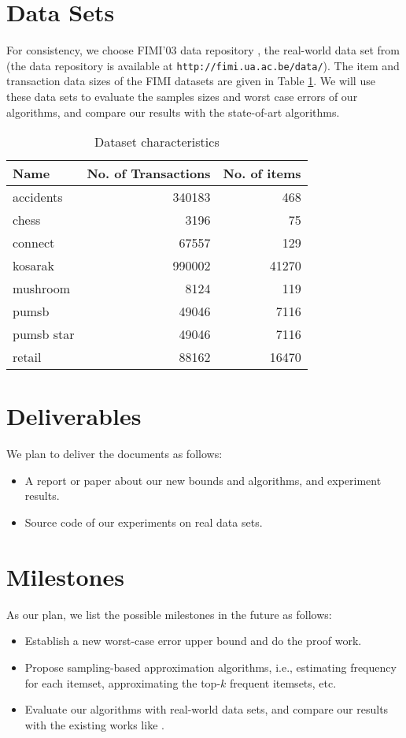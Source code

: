 \documentclass{article}
\begin{document}
\section{Data Sets}
For consistency, we choose FIMI'03 data repository \cite{GZ04}, the real-world data set from \cite{RU15} (the data repository is available at \texttt{http://fimi.ua.ac.be/data/}). The item and transaction data sizes of the FIMI datasets are given in Table \ref{tab:data}. We will use these data sets to evaluate the samples sizes and worst case errors of our algorithms, and compare our results with the state-of-art algorithms.

\begin{table}[!t]
\centering
\begin{tabular}{l | r r}
\hline
Name & No. of Transactions & No. of items \\
\hline
accidents & 340183 & 468 \\
chess & 3196 & 75 \\
connect & 67557 & 129 \\
kosarak & 990002 & 41270 \\
mushroom & 8124 & 119 \\
pumsb & 49046 & 7116 \\
pumsb star & 49046 &  7116 \\
retail  & 88162 & 16470 \\
\hline

\end{tabular}
\caption{Dataset characteristics}
\label{tab:data}
\end{table}

\section{Deliverables}
We plan to deliver the documents as follows:
\begin{itemize}
\item A report or paper about our new bounds and algorithms, and experiment results.
\item Source code of our experiments on real data sets.
\end{itemize}

\section{Milestones}
As our plan, we list the possible milestones in the future as follows:
\begin{itemize}
\item Establish a new worst-case error upper bound and do the proof work.
\item Propose sampling-based approximation algorithms, i.e., estimating frequency for each itemset, approximating the top-$k$ frequent itemsets, etc.
\item Evaluate our algorithms with real-world data sets, and compare our results with the existing works like \cite{RU15}.
\end{itemize}


%


\end{document}
